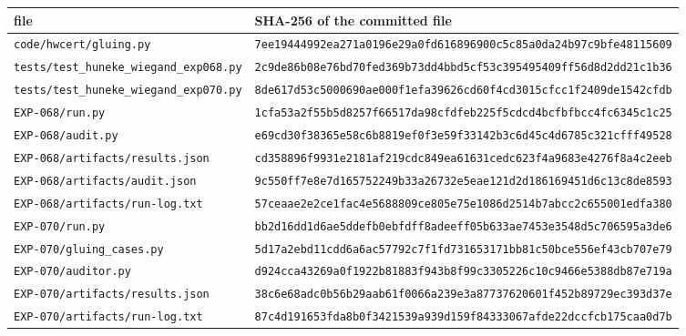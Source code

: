 \begin{tabular}{@{}p{5.5cm}p{9.6cm}@{}}
\toprule
file & SHA-256 of the committed file\\
\midrule
\texttt{\scriptsize code/hwcert/gluing.py} & \texttt{\scriptsize 7ee19444992ea271a0196e29a0fd616896900c5c85a0da24b97c9bfe48115609} \\
\texttt{\scriptsize tests/test\_huneke\_wiegand\_exp068.py} & \texttt{\scriptsize 2c9de86b08e76bd70fed369b73dd4bbd5cf53c395495409ff56d8d2dd21c1b36} \\
\texttt{\scriptsize tests/test\_huneke\_wiegand\_exp070.py} & \texttt{\scriptsize 8de617d53c5000690ae000f1efa39626cd60f4cd3015cfcc1f2409de1542cfdb} \\
\texttt{\scriptsize EXP-068/run.py} & \texttt{\scriptsize 1cfa53a2f55b5d8257f66517da98cfdfeb225f5cdcd4bcfbfbcc4fc6345c1c25} \\
\texttt{\scriptsize EXP-068/audit.py} & \texttt{\scriptsize e69cd30f38365e58c6b8819ef0f3e59f33142b3c6d45c4d6785c321cfff49528} \\
\texttt{\scriptsize EXP-068/artifacts/results.json} & \texttt{\scriptsize cd358896f9931e2181af219cdc849ea61631cedc623f4a9683e4276f8a4c2eeb} \\
\texttt{\scriptsize EXP-068/artifacts/audit.json} & \texttt{\scriptsize 9c550ff7e8e7d165752249b33a26732e5eae121d2d186169451d6c13c8de8593} \\
\texttt{\scriptsize EXP-068/artifacts/run-log.txt} & \texttt{\scriptsize 57ceaae2e2ce1fac4e5688809ce805e75e1086d2514b7abcc2c655001edfa380} \\
\texttt{\scriptsize EXP-070/run.py} & \texttt{\scriptsize bb2d16dd1d6ae5ddefb0ebfdff8adeeff05b633ae7453e3548d5c706595a3de6} \\
\texttt{\scriptsize EXP-070/gluing\_cases.py} & \texttt{\scriptsize 5d17a2ebd11cdd6a6ac57792c7f1fd731653171bb81c50bce556ef43cb707e79} \\
\texttt{\scriptsize EXP-070/auditor.py} & \texttt{\scriptsize d924cca43269a0f1922b81883f943b8f99c3305226c10c9466e5388db87e719a} \\
\texttt{\scriptsize EXP-070/artifacts/results.json} & \texttt{\scriptsize 38c6e68adc0b56b29aab61f0066a239e3a87737620601f452b89729ec393d37e} \\
\texttt{\scriptsize EXP-070/artifacts/run-log.txt} & \texttt{\scriptsize 87c4d191653fda8b0f3421539a939d159f84333067afde22dccfcb175caa0d7b} \\
\bottomrule
\end{tabular}
